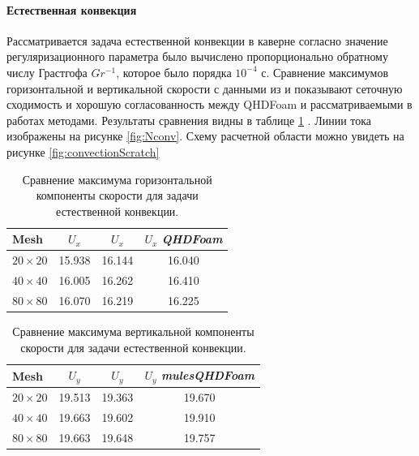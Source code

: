 \paragraph{Естественная конвекция}

Рассматривается задача естественной конвекции в каверне согласно \cite{ElizarBook} значение регуляризационного параметра было вычислено пропорционально обратному числу Грастгофа $Gr^{-1}$, которое было порядка $10^{-4}$ с. Сравнение максимумов горизонтальной и вертикальной скорости с данными из \cite{ElizarBook} и \cite{Vabishevich} показывают сеточную сходимость и хорошую согласованность между QHDFoam и рассматриваемыми в работах методами. Результаты сравнения видны в таблице \ref{table:tabHotCavityHor} . Линии тока изображены на рисунке \ref{fig:Nconv}. Схему расчетной области можно увидеть на рисунке \ref{fig:convectionScratch}

\begin{table}[!hb]
\caption { Сравнение максимума горизонтальной компоненты скорости для задачи естественной конвекции.}
\centering
\noindent\begin{tabular}{l|ccc}
Mesh & $U_x$ \cite{ElizarBook} & $U_x$ \cite{Vabishevich} & $U_x$ \textit{QHDFoam} \\
\hline
$20\times20$ & 15.938 & 16.144 & 16.040\\
$40\times40$ & 16.005 & 16.262 & 16.410\\
$80\times80$ & 16.070 & 16.219 & 16.225
\end{tabular}
\label{table:tabHotCavityHor}
\end{table}

 \begin{table}[!h]
\centering
\caption {Сравнение максимума вертикальной компоненты скорости для задачи естественной конвекции.}
\noindent\begin{tabular}{l|ccc}
Mesh & $U_y$ \cite{ElizarBook} & $U_y$ \cite{Vabishevich} & $U_y$ \textit{mulesQHDFoam} \\
\hline
$20\times20$ & 19.513 & 19.363 & 19.670\\
$40\times40$ & 19.663 & 19.602 & 19.910\\
$80\times80$ & 19.663 & 19.648 & 19.757
\end{tabular}
\label{table:tabHotCavityVer}
\end{table}

